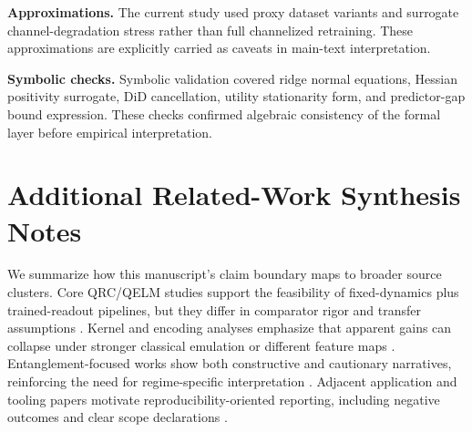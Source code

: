\documentclass{article} %
\begin{document}
\textbf{Approximations.} The current study used proxy dataset variants and surrogate channel-degradation stress rather than full channelized retraining. These approximations are explicitly carried as caveats in main-text interpretation.

\textbf{Symbolic checks.} Symbolic validation covered ridge normal equations, Hessian positivity surrogate, DiD cancellation, utility stationarity form, and predictor-gap bound expression. These checks confirmed algebraic consistency of the formal layer before empirical interpretation.

\section{Additional Related-Work Synthesis Notes}\label{app:rw_notes}
We summarize how this manuscript's claim boundary maps to broader source clusters. Core QRC/QELM studies support the feasibility of fixed-dynamics plus trained-readout pipelines, but they differ in comparator rigor and transfer assumptions \citep{S001,S003,S004,S010,S023,S029,S032,S033,S036,S039}. Kernel and encoding analyses emphasize that apparent gains can collapse under stronger classical emulation or different feature maps \citep{S006,S007,S020,S022,S030,S035}. Entanglement-focused works show both constructive and cautionary narratives, reinforcing the need for regime-specific interpretation \citep{S002,S012,S018,S019,S025,S026,S028,S034,S038}. Adjacent application and tooling papers motivate reproducibility-oriented reporting, including negative outcomes and clear scope declarations \citep{S008,S009,S011,S013,S014,S015,S016,S017,S021,S024,S027,S031,S037}.
\end{document}
